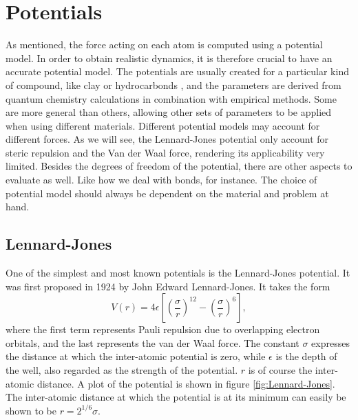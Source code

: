 \documentclass[twoside,english]{uiofysmaster}
\newcommand\lr[1]{\left(#1\right)}
\begin{document}
\section{Potentials}
As mentioned, the force acting on each atom is computed using a potential model.
In order to obtain realistic dynamics, it is therefore crucial to have an accurate potential model. 
The potentials are usually created for a particular kind of compound, like clay or hydrocarbonds \cite{Cygan2004,VanDuin2001}, and the parameters are derived from quantum chemistry calculations in combination with empirical methods.
Some are more general than others, allowing other sets of parameters to be applied when using different materials. 
Different potential models may account for different forces. 
As we will see, the Lennard-Jones potential only account for steric repulsion and the Van der Waal force, rendering its applicability very limited.
Besides the degrees of freedom of the potential, there are other aspects to evaluate as well. 
Like how we deal with bonds, for instance.
The choice of potential model should always be dependent on the material and problem at hand.  
 

\subsection{Lennard-Jones} \label{sec:LJ}
One of the simplest and most known potentials is the Lennard-Jones potential. It was first proposed in 1924 by John Edward Lennard-Jones.  It takes the form
\begin{equation}
	V(r) = 4\epsilon\left[\lr{\frac{\sigma}{r}}^{12} -  \lr{\frac{\sigma}{r}}^6 \right], \label{eq:Lennard-Jones}
\end{equation}
where the first term represents Pauli repulsion due to overlapping electron orbitals, and the last represents the van der Waal force. 
The constant $\sigma$ expresses the distance at which the inter-atomic potential is zero, while $\epsilon$ is the depth of the well, also regarded as the strength of the potential.
$r$ is of course the inter-atomic distance. 
A plot of the potential is shown in figure \ref{fig:Lennard-Jones}.
The inter-atomic distance at which the potential is at its minimum can easily be shown to be $r=2^{1/6}\sigma$. 
\end{document}
